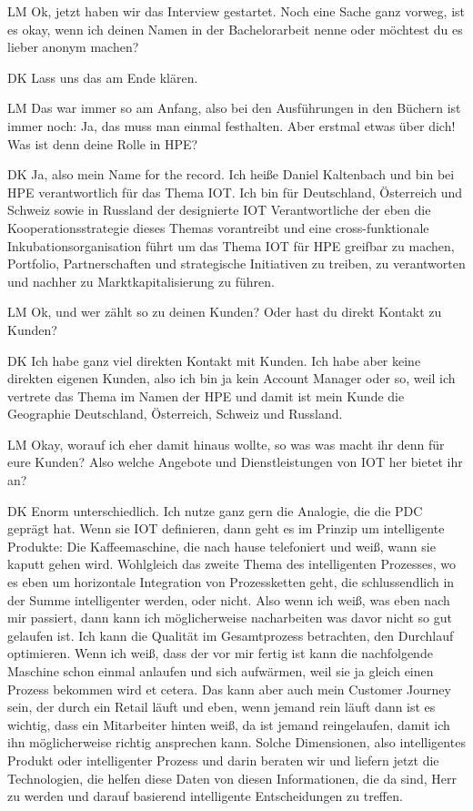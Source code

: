 \begin{xlist}
     \item[LM] Ok, jetzt haben wir das Interview gestartet. Noch eine Sache ganz vorweg, ist es okay, wenn ich deinen Namen in der Bachelorarbeit nenne oder möchtest du es lieber anonym machen?
     \item[DK] Lass uns das am Ende klären.
     \item[LM] Das war immer so am Anfang, also bei den Ausführungen in den Büchern ist immer noch: Ja, das muss man einmal festhalten. Aber erstmal etwas über dich! Was ist denn deine Rolle in HPE?
     \item[DK] Ja, also mein Name for the record. Ich heiße Daniel Kaltenbach und bin bei HPE  verantwortlich für das Thema IOT. Ich bin für Deutschland, Österreich und Schweiz sowie in Russland der designierte IOT Verantwortliche der eben die Kooperationsstrategie dieses Themas vorantreibt und eine cross-funktionale Inkubationsorganisation führt um das Thema IOT für HPE greifbar zu machen, Portfolio, Partnerschaften und strategische Initiativen zu treiben, zu verantworten und nachher zu Marktkapitalisierung zu führen.
     \item[LM] Ok, und wer zählt so zu deinen Kunden? Oder hast du direkt Kontakt zu Kunden?
     \item[DK] Ich habe ganz viel direkten Kontakt mit Kunden. Ich habe aber keine direkten eigenen Kunden, also ich bin ja kein Account Manager oder so, weil ich vertrete das Thema im Namen der HPE und damit ist mein Kunde die Geographie Deutschland, Österreich, Schweiz und Russland.
     \item[LM] Okay, worauf ich eher damit hinaus wollte, so was was macht ihr denn für eure Kunden? Also welche Angebote und Dienstleistungen von IOT her bietet ihr an?
     \item[DK] Enorm unterschiedlich. Ich nutze ganz gern die Analogie, die die PDC geprägt hat. Wenn sie IOT definieren, dann geht es im Prinzip um intelligente Produkte: Die Kaffeemaschine, die nach hause telefoniert und weiß, wann sie kaputt gehen wird. Wohlgleich das zweite Thema des  intelligenten Prozesses, wo es eben um horizontale Integration von Prozessketten geht, die schlussendlich in der Summe intelligenter werden, oder nicht. Also wenn ich weiß, was eben nach mir passiert, dann kann ich möglicherweise nacharbeiten was davor nicht so gut gelaufen ist. Ich kann die Qualität im Gesamtprozess betrachten, den Durchlauf optimieren. Wenn ich  weiß, dass der vor mir fertig ist kann die nachfolgende Maschine schon einmal anlaufen und sich aufwärmen, weil sie ja gleich einen Prozess bekommen wird et cetera. Das kann aber auch mein Customer Journey sein, der durch ein Retail läuft und eben, wenn jemand rein läuft dann ist es wichtig, dass ein Mitarbeiter hinten weiß, da ist jemand reingelaufen, damit ich ihn möglicherweise richtig ansprechen kann. Solche Dimensionen, also intelligentes Produkt oder intelligenter Prozess und darin beraten wir und liefern jetzt die Technologien, die helfen diese Daten von diesen Informationen, die da sind, Herr zu werden und darauf basierend intelligente Entscheidungen zu treffen.

\end{xlist}
